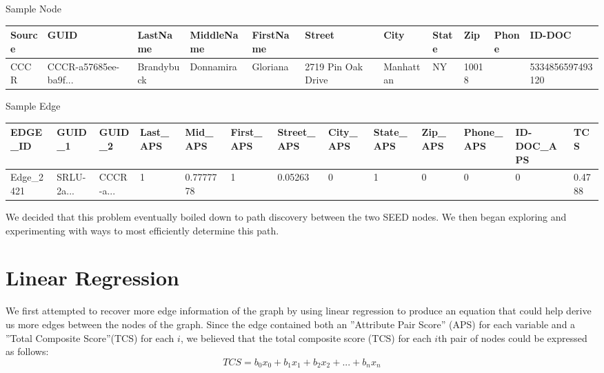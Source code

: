 \documentclass{article} %
\begin{document}


Sample Node


\begin{table}[h]
\centering
\tiny
\begin{tabular}{|l|l|l|l|l|l|l|l|l|l|l|}
\hline
\textbf{Source} & \textbf{GUID} & \textbf{LastName} & \textbf{MiddleName} & \textbf{FirstName} & \textbf{Street} & \textbf{City} & \textbf{State} & \textbf{Zip} & \textbf{Phone} & \textbf{ID-DOC} \\ \hline
CCCR & CCCR-a57685ee-ba9f... & Brandybuck & Donnamira & Gloriana & 2719 Pin Oak Drive & Manhattan & NY & 10018 &  & 5334856597493120 \\ \hline
\end{tabular}
\end{table}


Sample Edge

\begin{table}[h]
\tiny
\begin{tabular}{|l|l|l|l|l|l|l|l|l|l|l|l|l|}
\hline
\textbf{EDGE\_ID} & \textbf{GUID\_1} & \textbf{GUID\_2} & \textbf{Last\_APS} & \textbf{Mid\_APS} & \textbf{First\_APS} & \textbf{Street\_APS} & \textbf{City\_APS} & \textbf{State\_APS} & \textbf{Zip\_APS} & \textbf{Phone\_APS} & \textbf{ID-DOC\_APS} & \textbf{TCS} \\ \hline
Edge\_2421 & SRLU-2a... & CCCR-a... & 1 & 0.7777778 & 1 & 0.05263 & 0 & 1 & 0 & 0 & 0 & 0.4788 \\ \hline
\end{tabular}
\end{table}

We decided that this problem eventually boiled down to path discovery between the two SEED nodes. We then began exploring and experimenting with ways to most efficiently determine this path.

\section{Linear Regression}

We first attempted to recover more edge information of the graph by using linear regression to produce an equation that could help derive us more edges between the nodes of the graph. Since the edge contained both an ''Attribute Pair Score'' (APS) for each variable and a ''Total Composite Score''(TCS) for each $i$, we believed that the total composite score (TCS) for each $i$th pair of nodes could be expressed as follows:
\[
TCS = b_0x_0 + b_1x_1 + b_2x_2 + ... + b_nx_n
\]
\end{document}
